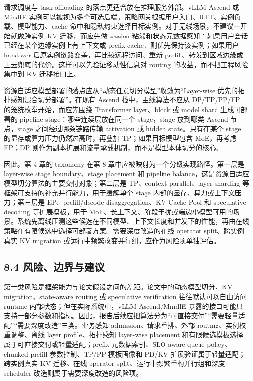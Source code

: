请求调度与 task offloading 的落点更适合放在推理服务外部。vLLM Ascend 或 MindIE 实例可以被视为多个可选后端，策略网关根据用户入口、RTT、实例负载、模型能力、cache 命中和隐私约束选择目标实例。对于无线场景，不建议一开始就做跨实例 KV 迁移，而应先做 session 粘滞和状态元数据感知：如果用户会话已经在某个边缘实例上有上下文或 prefix cache，则优先保持该实例；如果用户 handover 后原实例链路变差，再比较远程访问、重新 prefill、转发到区域边缘或上云兜底的代价。这样可以先验证移动性信息对 routing 的收益，而不把工程风险集中到 KV 迁移接口上。

资源自适应模型部署的落点应从“动态任意切分模型”收敛为“Layer-wise 优先的拓扑感知混合切分部署”。在现有 Ascend 栈中，主线算法不应从 DP/TP/PP/EP 的笼统枚举开始，而应先围绕 Transformer layer、block 或 model shard 生成可部署的 pipeline stage：哪些连续层放在同一个 stage，stage 放到哪类 Ascend 节点，stage 之间经过哪条链路传输 activation 或 hidden state。只有在某个 stage 的显存或算力压力仍然过高时，再叠加 TP；如果目标模型包含 MoE，再考虑 EP；DP 则作为副本扩展和流量承载机制，而不是模型本体切分的核心。

因此，第 4 章的 taxonomy 在第 8 章中应被映射为一个分级实现路径。第一层是 layer-wise stage boundary、stage placement 和 pipeline balance，这是资源自适应模型切分算法的主要交付对象；第二层是 TP、context parallel、layer sharding 等框架可支持的补充并行能力，用于缓解单个 stage 内部的显存、算力或上下文压力；第三层是 EP、prefill/decode disaggregation、KV Cache Pool 和 speculative decoding 等扩展模板，用于 MoE、长上下文、阶段干扰或端边小模型可用的场景。系统先离线压测这些候选在不同模型、上下文长度和并发下的性能，再由在线策略在有限候选中选择可部署方案。需要深度改造的在线 operator split、跨实例真实 KV migration 或运行中频繁改变并行组，应作为风险项单独评估。

\subsection*{8.4 风险、边界与建议}

第一类风险是框架能力与论文假设之间的差距。论文中的动态模型切分、KV migration、state-aware routing 或 speculative verification 往往默认可以自由访问 runtime 内部状态；但在实际系统中，vLLM Ascend/MindIE 暴露的接口可能只支持一部分参数和指标。因此，报告后续应把算法分为“可直接交付”“需要轻量适配”“需要深度改造”三类。业务感知 admission、请求重排、外部 routing、实例权重调整、离线 layer profile、拓扑感知 layer-wise placement 和有限候选模板选择属于可直接交付或轻量适配；prefix 元数据索引、SLO-aware queue policy、chunked prefill 参数控制、TP/PP 模板画像和 PD/KV 扩展验证属于轻量适配；跨实例真实 KV 迁移、在线 operator split、运行中频繁重构并行组和深度 scheduler 改造则属于需要深度改造的风险项。

